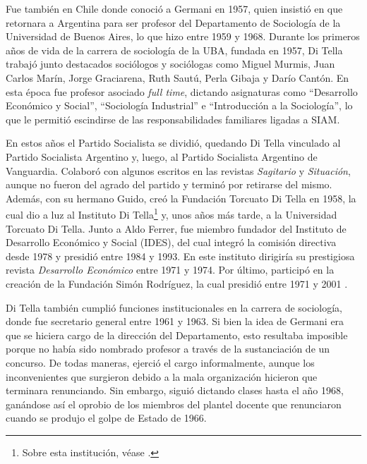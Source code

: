 Fue también en Chile donde conoció a Germani en 1957, quien insistió en que retornara a Argentina para ser profesor del Departamento de Sociología de la Universidad de Buenos Aires, lo que hizo entre 1959 y 1968. Durante los primeros años de vida de la carrera de sociología de la UBA, fundada en 1957, Di Tella trabajó junto destacados sociólogos y sociólogas como Miguel Murmis, Juan Carlos Marín, Jorge Graciarena, Ruth Sautú, Perla Gibaja y Darío Cantón. En esta época fue profesor asociado \emph{full time}, dictando asignaturas como \enquote{Desarrollo Económico y Social}, \enquote{Sociología Industrial} e \enquote{Introducción a la Sociología}, lo que le permitió escindirse de las responsabilidades familiares ligadas a SIAM.

En estos años el Partido Socialista se dividió, quedando Di Tella vinculado al Partido Socialista Argentino y, luego, al Partido Socialista Argentino de Vanguardia. Colaboró con algunos escritos en las revistas \emph{Sagitario} y \emph{Situación}, aunque no fueron del agrado del partido y terminó por retirarse del mismo. Además, con su hermano Guido, creó la Fundación Torcuato Di Tella en 1958, la cual dio a luz al Instituto Di Tella\footnote{Sobre esta institución, véase \textcite{1629-GARCIA2021,1688-KING2007}.} y, unos años más tarde, a la Universidad Torcuato Di Tella. Junto a Aldo Ferrer, fue miembro fundador del Instituto de Desarrollo Económico y Social (IDES), del cual integró la comisión directiva desde 1978 y presidió entre 1984 y 1993. En este instituto dirigiría su prestigiosa revista \emph{Desarrollo Económico} entre 1971 y 1974. Por último, participó en la creación de la Fundación Simón Rodríguez, la cual presidió entre 1971 y 2001 \parencite{1553-CAMOU2009,1648-DITELLA2019}.

Di Tella también cumplió funciones institucionales en la carrera de sociología, donde fue secretario general entre 1961 y 1963. Si bien la idea de Germani era que se hiciera cargo de la dirección del Departamento, esto resultaba imposible porque no había sido nombrado profesor a través de la sustanciación de un concurso. De todas maneras, ejerció el cargo informalmente, aunque los inconvenientes que surgieron debido a la mala organización hicieron que terminara renunciando. Sin embargo, siguió dictando clases hasta el año 1968, ganándose así el oprobio de los miembros del plantel docente que renunciaron cuando se produjo el golpe de Estado de 1966.

